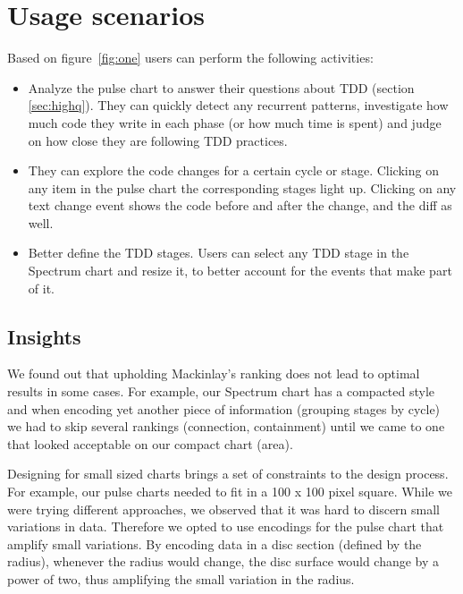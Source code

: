 \documentclass[journal]{vgtc}                %
\begin{document}
\section{Usage scenarios}

Based on figure~\ref{fig:one} users can perform the following activities:
\begin{itemize}
	\item Analyze the pulse chart to answer their questions about TDD (section \ref{sec:highq}). 
	They can quickly detect any recurrent patterns, investigate how much code  they write in each phase (or how much time is spent) and judge on how close they are following TDD practices.
	
	\item They can explore the code changes for a certain cycle or stage. 
	Clicking on any item in the pulse chart the corresponding stages light up.
	Clicking on any text change event shows the code before and after the change, and the diff as well.
	
	\item Better define the TDD stages.
	Users can select any TDD stage in the Spectrum chart and resize it, to better account for the events that make part of it.
\end{itemize}

\subsection{Insights}

We found out that upholding Mackinlay's ranking does not lead to optimal results in some cases.
For example, our Spectrum chart has a compacted style and when encoding yet another piece of information (grouping stages by cycle) we had to skip several rankings (connection, containment) until we came to one that looked acceptable on our compact chart (area).

Designing for small sized charts brings a set of constraints to the design process.
For example, our pulse charts needed to fit in a 100 x 100 pixel square.
While we were trying different approaches, we observed that it was hard to discern small variations in data.
Therefore we opted to use encodings for the pulse chart that amplify small variations.
By encoding data in a disc section (defined by the radius), whenever the radius would change, the disc surface would change by a power of two, thus amplifying the small variation in the radius.
\end{document}
